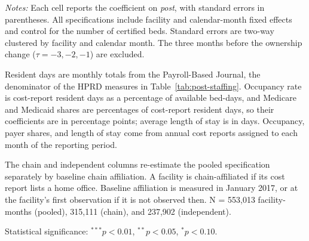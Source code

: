 \begin{table}[!ht]
\begin{threeparttable}
\begin{tablenotes}[flushleft]
\footnotesize
\item \textit{Notes:} Each cell reports the coefficient on \textit{post}, with standard errors in parentheses. All specifications include facility and calendar-month fixed effects and control for the number of certified beds. Standard errors are two-way clustered by facility and calendar month. The three months before the ownership change ($\tau = -3, -2, -1$) are excluded.
\item Resident days are monthly totals from the Payroll-Based Journal, the denominator of the HPRD measures in Table~\ref{tab:post-staffing}. Occupancy rate is cost-report resident days as a percentage of available bed-days, and Medicare and Medicaid shares are percentages of cost-report resident days, so their coefficients are in percentage points; average length of stay is in days. Occupancy, payer shares, and length of stay come from annual cost reports assigned to each month of the reporting period.
\item The chain and independent columns re-estimate the pooled specification separately by baseline chain affiliation. A facility is chain-affiliated if its cost report lists a home office. Baseline affiliation is measured in January 2017, or at the facility's first observation if it is not observed then. N = 553,013 facility-months (pooled), 315,111 (chain), and 237,902 (independent).
\item Statistical significance: $^{***}p<0.01$, $^{**}p<0.05$, $^{*}p<0.10$.
\end{tablenotes}

\end{threeparttable}
\end{table}
